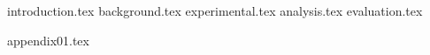 \documentclass[11pt,a4paper]{article}
\numberwithin{figure}{section}
\numberwithin{table}{section}
\begin{document}





\clearpage


\clearpage


\clearpage


\clearpage


\renewcommand{\contentsname}{Table of Contents}
\setcounter{tocdepth}{3}
\tableofcontents
{}
\clearpage

\listoftables
{}
\clearpage

\listoffigures
{}
\clearpage



{introduction.tex}
\clearpage
{background.tex}
\clearpage
{experimental.tex}
\clearpage
{analysis.tex}
\clearpage
{evaluation.tex}
\clearpage


{appendix01.tex}
\clearpage




\thispagestyle{empty}
\clearpage
\end{document}
